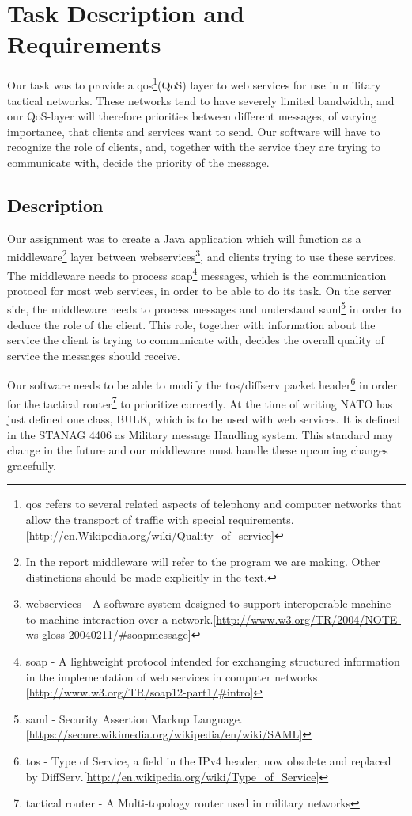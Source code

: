 \section{Task Description and Requirements}\label{Task Description and Requirements} 
    Our task was to provide a \gls{qos}\footnote{\gls{qos} refers to several related aspects of telephony and computer networks that allow the transport of traffic with special requirements.[\url{http://en.Wikipedia.org/wiki/Quality_of_service}]}(QoS) layer to web services for use in military tactical networks. These networks tend to have severely limited bandwidth, and our QoS-layer will therefore priorities between different messages, of varying importance, that clients and services want to send. Our software will have to recognize the role of clients, and, together with the service they are trying to communicate with, decide the priority of the message.
    
    \subsection{Description}\label{Description}        
    Our assignment was to create a Java application which will function as a \gls{middleware}\footnote{In the report \gls{middleware} will refer to the program we are making. Other distinctions should be made explicitly in the text.} layer between \glspl{webservice}\footnote{\glspl{webservice} - A software system designed to support interoperable machine-to-machine interaction over a network.[\url{http://www.w3.org/TR/2004/NOTE-ws-gloss-20040211/\#soapmessage}]}, and clients trying to use these services. The middleware needs to process \gls{soap}\footnote{\gls{soap} - A lightweight protocol intended for exchanging structured information in the implementation of web services in computer networks.[\url{http://www.w3.org/TR/soap12-part1/\#intro}]} messages, which is the communication protocol for most web services, in order to be able to do its task. On the server side, the middleware needs to process messages and understand \gls{saml}\footnote{\gls{saml} - Security Assertion Markup Language.[\url{https://secure.wikimedia.org/wikipedia/en/wiki/SAML}]} in order to deduce the role of the client. This role, together with information about the service the client is trying to communicate with, decides the overall quality of service the messages should receive. 

    Our software needs to be able to modify the \gls{tos}/\gls{diffserv} \gls{packet} header\footnote{\gls{tos} - Type of Service, a field in the IPv4 header, now obsolete and replaced by DiffServ.[\url{http://en.wikipedia.org/wiki/Type_of_Service}]} in order for the \gls{tactical router}\footnote{\Gls{tactical router} - A Multi-topology router used in military networks} to prioritize correctly. At the time of writing NATO has just defined one class, BULK, which is to be used with web services. It is defined in the STANAG 4406 as Military message Handling system. This standard may change in the future and our middleware must handle these upcoming changes gracefully.

